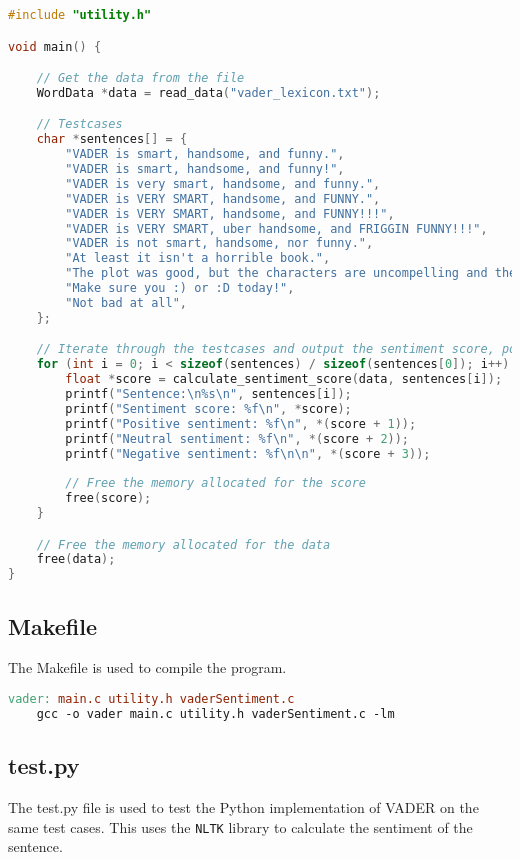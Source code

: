 \documentclass[12pt]{article}
\begin{document}
\begin{lstlisting}[language=c, basicstyle=\small, breaklines=true]
#include "utility.h"

void main() {

	// Get the data from the file
    WordData *data = read_data("vader_lexicon.txt");

	// Testcases
	char *sentences[] = {
		"VADER is smart, handsome, and funny.",
		"VADER is smart, handsome, and funny!",
		"VADER is very smart, handsome, and funny.",
		"VADER is VERY SMART, handsome, and FUNNY.",
		"VADER is VERY SMART, handsome, and FUNNY!!!",
		"VADER is VERY SMART, uber handsome, and FRIGGIN FUNNY!!!",
		"VADER is not smart, handsome, nor funny.",
		"At least it isn't a horrible book.",
		"The plot was good, but the characters are uncompelling and the dialog is not great.",
		"Make sure you :) or :D today!",
		"Not bad at all",
	};

	// Iterate through the testcases and output the sentiment score, positive sentiment, neutral sentiment, and negative sentiment
	for (int i = 0; i < sizeof(sentences) / sizeof(sentences[0]); i++) {
		float *score = calculate_sentiment_score(data, sentences[i]);
		printf("Sentence:\n%s\n", sentences[i]);
		printf("Sentiment score: %f\n", *score);
		printf("Positive sentiment: %f\n", *(score + 1));
		printf("Neutral sentiment: %f\n", *(score + 2));
		printf("Negative sentiment: %f\n\n", *(score + 3));
		
		// Free the memory allocated for the score
		free(score);
	}

	// Free the memory allocated for the data
	free(data);
}
\end{lstlisting}

\subsection{Makefile}

The Makefile is used to compile the program.

\begin{lstlisting}[language=make]
vader: main.c utility.h vaderSentiment.c
	gcc -o vader main.c utility.h vaderSentiment.c -lm
\end{lstlisting}

\subsection{test.py}

The test.py file is used to test the Python implementation of VADER on the same test cases.
This uses the \texttt{NLTK} library to calculate the sentiment of the sentence.
\end{document}
